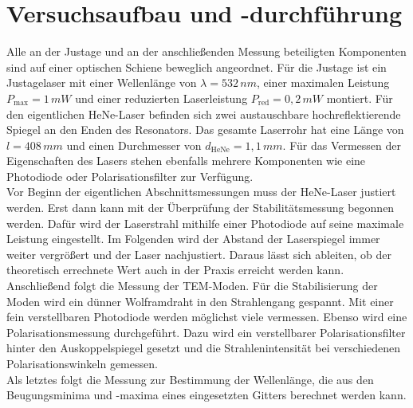 \section{Versuchsaufbau und -durchführung}
Alle an der Justage und an der anschließenden Messung beteiligten Komponenten sind auf einer optischen Schiene beweglich angeordnet.
Für die Justage ist ein Justagelaser mit einer Wellenlänge von $\lambda = 532\, \si{nm}$, einer maximalen Leistung $P_\text{max}=1\,\si{mW}$ und einer reduzierten Laserleistung $P_\text{red}=0,2\, \si{mW}$ montiert.
Für den eigentlichen HeNe-Laser befinden sich zwei austauschbare hochreflektierende Spiegel an den Enden des Resonators.
Das gesamte Laserrohr hat eine Länge von $l=408\,\si{mm}$ und einen Durchmesser von $d_\text{HeNe}=1,1\,\si{mm}$.
Für das Vermessen der Eigenschaften des Lasers stehen ebenfalls mehrere Komponenten wie eine Photodiode oder Polarisationsfilter zur Verfügung.\\

Vor Beginn der eigentlichen Abschnittsmessungen muss der HeNe-Laser justiert werden.
Erst dann kann mit der Überprüfung der Stabilitätsmessung begonnen werden. Dafür wird der Laserstrahl mithilfe einer Photodiode auf seine maximale Leistung eingestellt.
Im Folgenden wird der Abstand der Laserspiegel immer weiter vergrößert und der Laser nachjustiert. Daraus lässt sich ableiten, ob der theoretisch errechnete Wert auch in der Praxis erreicht werden kann.
Anschließend folgt die Messung der TEM-Moden.
Für die Stabilisierung der Moden wird ein dünner Wolframdraht in den Strahlengang gespannt. Mit einer fein verstellbaren Photodiode werden möglichst viele vermessen.
Ebenso wird eine Polarisationsmessung durchgeführt. Dazu wird ein verstellbarer Polarisationsfilter hinter den Auskoppelspiegel gesetzt und die Strahlenintensität bei verschiedenen Polarisationswinkeln gemessen.\\
Als letztes folgt die Messung zur Bestimmung der Wellenlänge, die aus den Beugungsminima und -maxima eines eingesetzten Gitters berechnet werden kann.
